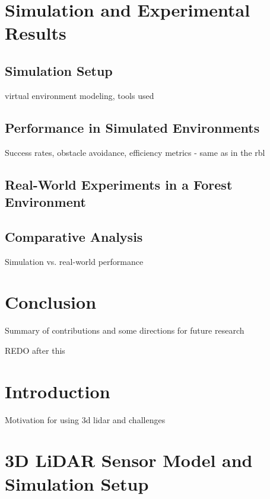     \section{Simulation and Experimental Results}
        \subsection{Simulation Setup}
            virtual environment modeling, tools used
        \subsection{Performance in Simulated Environments}
            Success rates, obstacle avoidance, efficiency metrics - same as in the rbl
        \subsection{Real-World Experiments in a Forest Environment}
        \subsection{Comparative Analysis}
            Simulation vs. real-world performance
    
    \section{Conclusion}
        Summary of contributions and some directions for future research
    






















REDO after this

\section{Introduction}

Motivation for using 3d lidar and challenges

\section{3D LiDAR Sensor Model and Simulation Setup}

